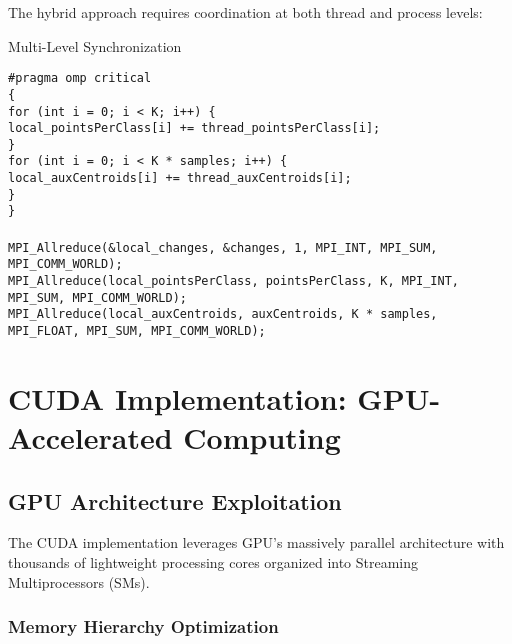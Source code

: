\documentclass[12pt,a4paper]{article}
\begin{document}
The hybrid approach requires coordination at both thread and process levels:

\begin{algorithm}[H]
\caption{Multi-Level Synchronization}
\label{alg:hybrid_sync}
\begin{flushleft}
\texttt{\#pragma omp critical}\\
\texttt{\{}\\
\hspace{1cm}\texttt{for (int i = 0; i < K; i++) \{}\\
\hspace{2cm}\texttt{local\_pointsPerClass[i] += thread\_pointsPerClass[i];}\\
\hspace{1cm}\texttt{\}}\\
\hspace{1cm}\texttt{for (int i = 0; i < K * samples; i++) \{}\\
\hspace{2cm}\texttt{local\_auxCentroids[i] += thread\_auxCentroids[i];}\\
\hspace{1cm}\texttt{\}}\\
\texttt{\}}\\
\\
\texttt{MPI\_Allreduce(\&local\_changes, \&changes, 1, MPI\_INT, MPI\_SUM, MPI\_COMM\_WORLD);}\\
\texttt{MPI\_Allreduce(local\_pointsPerClass, pointsPerClass, K, MPI\_INT, MPI\_SUM, MPI\_COMM\_WORLD);}\\
\texttt{MPI\_Allreduce(local\_auxCentroids, auxCentroids, K * samples, MPI\_FLOAT, MPI\_SUM, MPI\_COMM\_WORLD);}
\end{flushleft}
\end{algorithm}

\section{CUDA Implementation: GPU-Accelerated Computing}

\subsection{GPU Architecture Exploitation}

The CUDA implementation leverages GPU's massively parallel architecture with thousands of lightweight processing cores organized into Streaming Multiprocessors (SMs).

\subsubsection{Memory Hierarchy Optimization}
\end{document}
